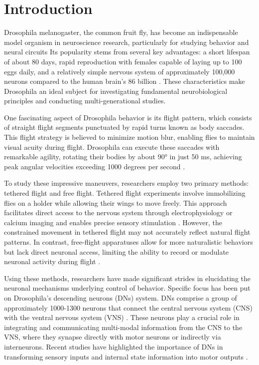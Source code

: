 \documentclass[../main/thesis_msc.tex]{subfiles}
\begin{document}
	\tableofcontents
	\newpage  %
    \chapter{Introduction}
    
	Drosophila melanogaster, the common fruit fly, has become an indispensable model organism in neuroscience research, particularly for studying behavior and neural circuits \autocite{bellen_100_2010} Its popularity stems from several key advantages: a short lifespan of about 80 days, rapid reproduction with females capable of laying up to 100 eggs daily, and a relatively simple nervous system of approximately 100,000 neurons compared to the human brain's 86 billion \autocite{hales_genetics_2015}. These characteristics make Drosophila an ideal subject for investigating fundamental neurobiological principles and conducting multi-generational studies.
	
	One fascinating aspect of Drosophila behavior is its flight pattern, which consists of straight flight segments punctuated by rapid turns known as body saccades. This flight strategy is believed to minimize motion blur, enabling flies to maintain visual acuity during flight. Drosophila can execute these saccades with remarkable agility, rotating their bodies by about 90° in just 50 ms, achieving peak angular velocities exceeding 1000 degrees per second \autocite{muijres_body_2015}.
	
	
	To study these impressive maneuvers, researchers employ two primary methods: tethered flight and free flight. Tethered flight experiments involve immobilizing flies on a holder while allowing their wings to move freely. This approach facilitates direct access to the nervous system through electrophysiology or calcium imaging and enables precise sensory stimulation \autocite{aymanns_descending_2022}. However, the constrained movement in tethered flight may not accurately reflect natural flight patterns. In contrast, free-flight apparatuses allow for more naturalistic behaviors but lack direct neuronal access, limiting the ability to record or modulate neuronal activity during flight \autocite{muijres_body_2015}.
	
	
	Using these methods, researchers have made significant strides in elucidating the neuronal mechanisms underlying control of behavior. Specific focus has been put on Drosophila's descending neurons (DNs) system. DNs comprise a group of approximately 1000-1300 neurons that connect the central nervous system (CNS) with the ventral nervous system (VNS) \autocite{azevedo_connectomic_2024,namiki_functional_2018}. These neurons play a crucial role in integrating and communicating multi-modal information from the CNS to the VNS, where they synapse directly with motor neurons or indirectly via interneurons. Recent studies have highlighted the importance of DNs in transforming sensory inputs and internal state information into motor outputs \autocite{namiki_functional_2018,simpson_descending_2024}.
	
\end{document}
